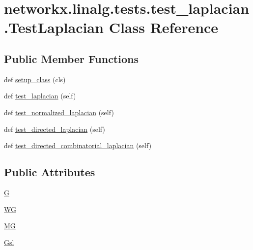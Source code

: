 \hypertarget{classnetworkx_1_1linalg_1_1tests_1_1test__laplacian_1_1TestLaplacian}{}\section{networkx.\+linalg.\+tests.\+test\+\_\+laplacian.\+Test\+Laplacian Class Reference}
\label{classnetworkx_1_1linalg_1_1tests_1_1test__laplacian_1_1TestLaplacian}
\subsection*{Public Member Functions}
\begin{DoxyCompactItemize}
\item 
def \hyperlink{classnetworkx_1_1linalg_1_1tests_1_1test__laplacian_1_1TestLaplacian_a37e438901d946a7c58abff96f02cbe29}{setup\+\_\+class} (cls)
\item 
def \hyperlink{classnetworkx_1_1linalg_1_1tests_1_1test__laplacian_1_1TestLaplacian_a2e7aa0dfdd657960e1d7332aedf7fa57}{test\+\_\+laplacian} (self)
\item 
def \hyperlink{classnetworkx_1_1linalg_1_1tests_1_1test__laplacian_1_1TestLaplacian_abc0abc24ba1970eb452d1cb444b85b24}{test\+\_\+normalized\+\_\+laplacian} (self)
\item 
def \hyperlink{classnetworkx_1_1linalg_1_1tests_1_1test__laplacian_1_1TestLaplacian_a955dd161d66cb68af05eb9bc60af9af8}{test\+\_\+directed\+\_\+laplacian} (self)
\item 
def \hyperlink{classnetworkx_1_1linalg_1_1tests_1_1test__laplacian_1_1TestLaplacian_a56c5e34aa78a3e4df702d1be6dfb6476}{test\+\_\+directed\+\_\+combinatorial\+\_\+laplacian} (self)
\end{DoxyCompactItemize}
\subsection*{Public Attributes}
\begin{DoxyCompactItemize}
\item 
\hyperlink{classnetworkx_1_1linalg_1_1tests_1_1test__laplacian_1_1TestLaplacian_a36f4c6becc820c0fa5c70ac6ec2960d3}{G}
\item 
\hyperlink{classnetworkx_1_1linalg_1_1tests_1_1test__laplacian_1_1TestLaplacian_ad7b979791f8a42ba90f23127b114741a}{WG}
\item 
\hyperlink{classnetworkx_1_1linalg_1_1tests_1_1test__laplacian_1_1TestLaplacian_a422fb775b8cde2f5bba818f7294b5429}{MG}
\item 
\hyperlink{classnetworkx_1_1linalg_1_1tests_1_1test__laplacian_1_1TestLaplacian_afc259bf838276c329a8a2e36cedad9a6}{Gsl}
\end{DoxyCompactItemize}



